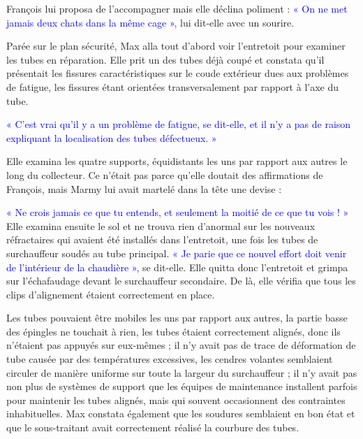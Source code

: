 François lui proposa de l’accompagner mais elle déclina poliment : \textcolor{blue}{« On ne met jamais deux chats dans la même cage »}, lui dit-elle avec un sourire.
\vspace{0.3cm}

Parée sur le plan sécurité, Max alla tout d’abord voir l’entretoit pour examiner les tubes en réparation. Elle prit un des tubes déjà coupé et constata qu’il présentait les fissures caractéristiques sur le coude extérieur dues aux problèmes de fatigue, les fissures étant orientées transversalement par rapport à l’axe du tube.
\vspace{0.3cm}

\textcolor{blue}{« C’est vrai qu’il y a un problème de fatigue, se dit-elle, et il n’y a pas de raison expliquant la localisation des tubes défectueux. »} 
\vspace{0.3cm}

Elle examina les quatre supports, équidistants les uns par rapport aux autres le long du collecteur. Ce n’était pas parce qu’elle doutait des affirmations de François, mais Marmy lui avait martelé dans la tête une devise : 

\textcolor{blue}{« Ne crois jamais ce que tu entends, et seulement la moitié de ce que tu vois ! »}
Elle examina ensuite le sol et ne trouva rien d’anormal sur les nouveaux réfractaires qui avaient été installés dans l’entretoit, une fois les tubes de surchauffeur soudés au tube principal. \textcolor{blue}{« Je parie que ce nouvel effort doit venir de l’intérieur de la chaudière »}, se dit-elle.
Elle quitta donc l’entretoit et grimpa sur l’échafaudage devant le surchauffeur secondaire. De là, elle vérifia que tous les clips d’alignement étaient correctement en place. 
\vspace{0.3cm}

Les tubes pouvaient être mobiles les uns par rapport aux autres, la partie basse des épingles ne touchait à rien, les tubes étaient correctement alignés, donc ils n’étaient pas appuyés sur eux-mêmes ; il n’y avait pas de trace de déformation de tube causée par des températures excessives, les cendres volantes semblaient circuler de manière uniforme sur toute la largeur du surchauffeur ; il n’y avait pas non plus de systèmes de support que les équipes de maintenance installent parfois pour maintenir les tubes alignés, mais qui souvent occasionnent des contraintes inhabituelles. Max constata également que les soudures semblaient en bon état et que le sous-traitant avait correctement réalisé la courbure des tubes.
\vspace{0.3cm}

